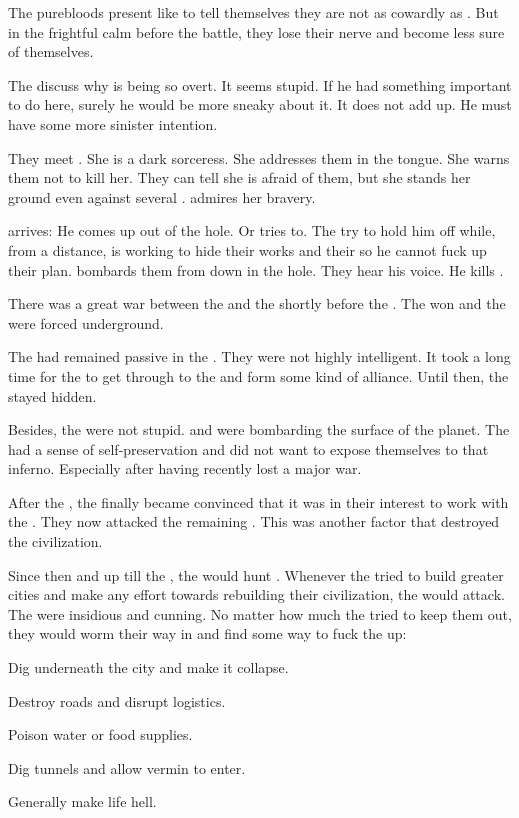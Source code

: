    The purebloods present like to tell themselves they are not as cowardly as \Achsah. 
    But in the frightful calm before the battle, they lose their nerve and become less sure of themselves. 
    
    The \resphain discuss why \Ishnaruchaefir is being so overt. 
    It seems stupid.
    If he had something important to do here, surely he would be more sneaky about it.
    It does not add up.
    He must have some more sinister intention.

    They meet \Criseis.
    She is a dark sorceress. 
    She addresses them in the \Resphan tongue. 
    She warns them not to kill her.
    They can tell she is afraid of them, but she stands her ground even against several \resphain.
    \Teshrial admires her bravery. 
  
  \Ishnaruchaefir arrives: 
    He comes up out of the hole. 
    Or tries to.
    The \resphain try to hold him off while, from a distance, \Urizeth is working to hide their works and their \noggyaleth so he cannot fuck up their plan. 
    \Ishnaruchaefir bombards them from down in the hole. 
    They hear his voice.
    He kills \Teshrial.


There was a great war between the \ophidians and the \noggyaleth shortly before the \firstbanewar.
The \ophidians won and the \noggyaleth were forced underground.

The \noggyaleth had remained passive in the \firstbanewar. 
They were not highly intelligent. 
It took a long time for the \banes to get through to the \noggyaleth and form some kind of alliance. 
Until then, the \noggyaleth stayed hidden. 

Besides, the \noggyaleth were not stupid.
\Banes and \ophidians were bombarding the surface of the planet.
The \noggyaleth had a sense of self-preservation and did not want to expose themselves to that inferno.
Especially after having recently lost a major war. 

After the \firstbanewar, the \noggyaleth finally became convinced that it was in their interest to work with the \banes. 
They now attacked the remaining \ophidians. 
This was another factor that destroyed the \ophidian civilization. 

Since then and up till the \thirdbanewar, the \noggyaleth would hunt \ophidians.
Whenever the \ophidians tried to build greater cities and make any effort towards rebuilding their civilization, the \noggyaleth would attack. 
The \noggyaleth were insidious and cunning.
No matter how much the \ophidians tried to keep them out, they would worm their way in and find some way to fuck the \ophidians up:
  \item Dig underneath the city and make it collapse.
  \item Destroy roads and disrupt logistics. 
  \item Poison water or food supplies.
  \item Dig tunnels and allow vermin to enter. 
  \item Generally make life hell. 

